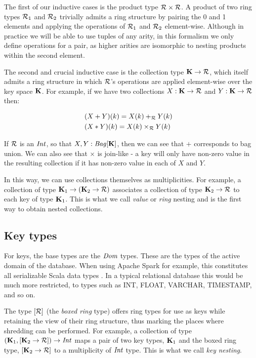 {{The first of our inductive cases is the product type $\mathcal{R} \times \mathcal{R}$. A product of two ring types $\mathcal{R}_1$ and $\mathcal{R}_2$ trivially admits a ring structure by pairing the 0 and 1 elements and applying the operations of $\mathcal{R}_1$ and $\mathcal{R}_2$ element-wise. Although in practice we will be able to use tuples of any arity, in this formalism we only define operations for a pair, as higher arities are isomorphic to nesting products within the second element.

The second and crucial inductive case is the collection type $\mathbf{K} \rightarrow \mathcal{R}$, which itself admits a ring structure in which $\mathcal{R}$'s operations are applied element-wise over the key space $\mathbf{K}$. For example, if we have two collections $X: \mathbf{K} \rightarrow \mathcal{R}$ and $Y: \mathbf{K} \rightarrow \mathcal{R}$ then:

\begin{equation*}
\begin{split}
& (X+Y)(k)  = X(k) +_{\mathcal{R}} Y(k) \\
& (X*Y)(k) = X(k) \times_{\mathcal{R}} Y(k)
\end{split}
\end{equation*}

If $\mathcal{R}$ is an $\textrm{\textit{Int}}$, so that $X,Y: \textrm{\textit{Bag}}[\mathbf{K}]$, then we can see that $+$ corresponds to bag union. We can also see that $\times$ is join-like - a key will only have non-zero value in the resulting collection if it has non-zero value in each of $X$ and $Y$.

In this way, we can use collections themselves as multiplicities. For example, a collection of type $\mathbf{K}_1 \rightarrow (\mathbf{K}_2 \rightarrow \mathcal{R})$ associates a collection of type $\mathbf{K}_2 \rightarrow \mathcal{R}$ to each key of type ${\mathbf{K}_1}$. This is what we call \textit{value} or \textit{ring} nesting and is the first way to obtain nested collections.

\subsection{Key types} {

For keys, the base types are the $\textrm{\textit{Dom}}$ types. These are the types of the active domain of the database. When using Apache Spark for example, this constitutes all serializable Scala data types \cite{}. In a typical relational database this would be much more restricted, to types such as INT, FLOAT, VARCHAR, TIMESTAMP, and so on. 

The type $[\mathcal{R}]$ (the \textit{boxed ring} type) offers ring types for use as keys while retaining the view of their ring structure, thus marking the places where shredding can be performed. For example, a collection of type $(\mathbf{K}_1,[\mathbf{K}_2 \rightarrow \mathcal{R}]) \rightarrow \textrm{\textit{Int}}$ maps a pair of two key types, $\mathbf{K}_1$ and the boxed ring type, $[\mathbf{K}_2 \rightarrow \mathcal{R}]$ to a multiplicity of $\textrm{\textit{Int}}$ type. This is what we call \textit{key nesting}. 

}}}
